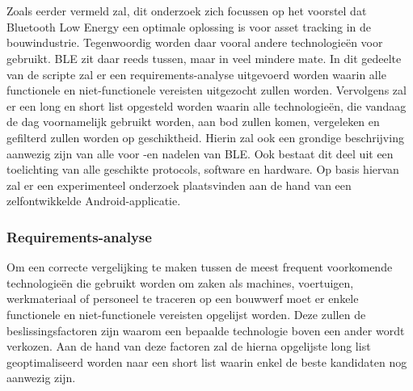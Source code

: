 
\chapter{}%
\label{ch:methodologie}


Zoals eerder vermeld zal, dit onderzoek zich focussen op het voorstel dat Bluetooth Low Energy een optimale oplossing is voor asset tracking in de bouwindustrie. Tegenwoordig worden daar vooral andere technologieën voor gebruikt. BLE zit daar reeds tussen, maar in veel mindere mate. In dit gedeelte van de scripte zal er een requirements-analyse uitgevoerd worden waarin alle functionele en niet-functionele vereisten uitgezocht zullen worden. Vervolgens zal er een long en short list opgesteld worden waarin alle technologieën, die vandaag de dag voornamelijk gebruikt worden, aan bod zullen komen, vergeleken en gefilterd zullen worden op geschiktheid. Hierin zal ook een grondige beschrijving aanwezig zijn van alle voor -en nadelen van BLE. Ook bestaat dit deel uit een toelichting van alle geschikte protocols, software en hardware. Op basis hiervan zal er een experimenteel onderzoek plaatsvinden aan de hand van een zelfontwikkelde Android-applicatie.

\subsection{Requirements-analyse}
Om een correcte vergelijking te maken tussen de meest frequent voorkomende technologieën die gebruikt worden om zaken als machines, voertuigen, werkmateriaal of personeel te traceren op een bouwwerf moet er enkele functionele en niet-functionele vereisten opgelijst worden. Deze zullen de beslissingsfactoren zijn waarom een bepaalde technologie boven een ander wordt verkozen. Aan de hand van deze factoren zal de hierna opgelijste long list geoptimaliseerd worden naar een short list waarin enkel de beste kandidaten nog aanwezig zijn.\\

